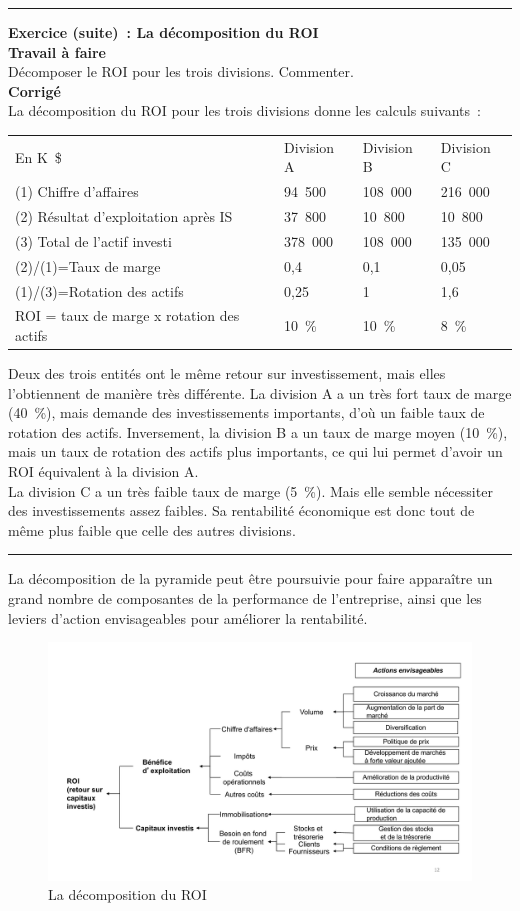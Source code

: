 \documentclass{tufte-handout}
\begin{document}
\begin{enumerate}
\noindent\rule{\textwidth}{0.5pt}
\textbf{Exercice (suite) : La décomposition du ROI}\\
\textbf{Travail à faire}\\
Décomposer le ROI pour les trois divisions. Commenter.\\
\textbf{Corrigé}\\
La décomposition du ROI pour les trois divisions donne les calculs suivants :\\
\begin{center}
\begin{tabular}{llll}
En K \$ & Division A & Division B & Division C\\
(1) Chiffre d'affaires & 94 500 & 108 000 & 216 000\\
(2) Résultat d'exploitation après IS & 37 800 & 10 800 & 10 800\\
(3) Total de l'actif investi & 378 000 & 108 000 & 135 000\\
(2)/(1)=Taux de marge & 0,4 & 0,1 & 0,05\\
(1)/(3)=Rotation des actifs & 0,25 & 1 & 1,6\\
ROI = taux de marge x rotation des actifs & 10 \% & 10 \% & 8 \%\\
\end{tabular}
\end{center}
Deux des trois entités ont le même retour sur investissement, mais elles l'obtiennent de manière très différente. La division A a un très fort taux de marge (40 \%), mais demande des investissements importants, d'où un faible taux de rotation des actifs. Inversement, la division B a un taux de marge moyen (10 \%), mais un taux de rotation des actifs plus importants, ce qui lui permet d'avoir un ROI équivalent à la division A.\\
La division C a un très faible taux de marge (5 \%). Mais elle semble nécessiter des investissements assez faibles. Sa rentabilité économique est donc tout de même plus faible que celle des autres divisions.\\

\noindent\rule{\textwidth}{0.5pt}
La décomposition de la pyramide peut être poursuivie pour faire apparaître un grand nombre de composantes de la performance de l'entreprise, ainsi que les leviers d'action envisageables pour améliorer la rentabilité.\\
\begin{figure}[htbp]
\centering
\includegraphics[width=.9\linewidth]{./img/roidetail.pdf}
\caption{La décomposition du ROI}
\end{figure}


\end{enumerate}
\end{document}
